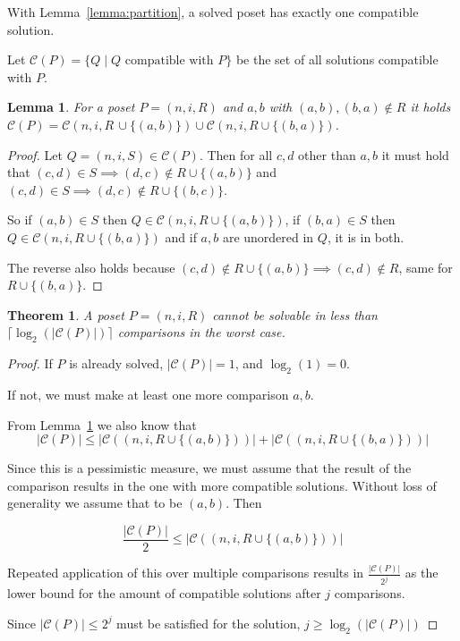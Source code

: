 \documentclass[10pt,journal,compsoc]{IEEEtran}
\newtheorem{theorem}{Theorem}
\newtheorem{lemma}{Lemma}
\begin{document}
With Lemma~\ref{lemma:partition}, a solved poset has exactly one compatible solution.

Let $\mathcal{C}(P) = \{Q \mid Q \text{ compatible with } P\}$ be the set of all solutions compatible with $P$.

\begin{lemma}\label{lemma:compatible_union}
  For a poset $P = (n, i, R)$ and $a, b$ with $(a, b), (b, a)\notin R$ it holds $\mathcal{C}(P) = \mathcal{C}(n, i, R \, \cup \{(a, b)\}) \cup \mathcal{C}(n, i, R\cup \{(b, a)\})$.
\end{lemma}

\begin{proof}
  Let $Q = (n, i, S)\in \mathcal{C}(P)$.
  Then for all $c, d$ other than $a, b$ it must hold that $(c, d)\in S\implies (d,c)\notin R\cup \{(a, b)\}$ and $(c, d)\in S\implies (d, c)\notin R\cup \{(b, c)\}$.

  So if $(a, b)\in S$ then $Q\in\mathcal{C}(n, i, R\cup \{(a, b)\})$, if $(b, a)\in S$ then $Q\in\mathcal{C}(n, i, R\cup \{(b, a)\})$
  and if $a, b$ are unordered in $Q$, it is in both.

  The reverse also holds because $(c, d)\notin R\cup \{(a, b)\}\implies (c, d)\notin R$, same for $R\cup \{(b, a)\}$.
\end{proof}

\begin{theorem}\label{theorem:compatible_log}
  A poset $P=(n,i,R)$ cannot be solvable in less than $\lceil\log_2(|\mathcal{C}(P)|)\rceil$ comparisons in the worst case.
\end{theorem}

\begin{proof}
  If $P$ is already solved, $|\mathcal{C}(P)|=1$, and $\log_2(1)=0$.

  If not, we must make at least one more comparison $a, b$.

  From Lemma~\ref{lemma:compatible_union} we also know that
  $$|\mathcal{C}(P)| \leq |\mathcal{C}((n,i,R\cup \{(a, b)\}))| + |\mathcal{C}((n,i,R\cup \{(b, a)\}))|$$

  Since this is a pessimistic measure, we must assume that the result of the comparison results in the one with more compatible solutions.
  Without loss of generality we assume that to be $(a, b)$.
  Then

  $$\frac{|\mathcal{C}(P)|}{2}\leq |\mathcal{C}((n,i,R\cup \{(a, b)\}))|$$

  Repeated application of this over multiple comparisons results in $\frac{|\mathcal{C}(P)|}{2^j}$ as the lower bound for the amount of compatible solutions after $j$ comparisons.

  Since $|\mathcal{C}(P)|\leq 2^j$ must be satisfied for the solution, $j\geq\log_2(|\mathcal{C}(P)|)$
\end{proof}
\end{document}
